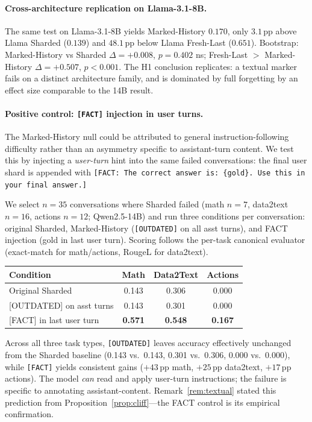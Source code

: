 \documentclass{article}
\begin{document}
\paragraph{Cross-architecture replication on Llama-3.1-8B.} The same test on Llama-3.1-8B yields Marked-History $0.170$, only $3.1$\,pp above Llama Sharded ($0.139$) and $48.1$\,pp below Llama Fresh-Last ($0.651$). Bootstrap: Marked-History vs Sharded $\Delta{=}{+}0.008$, $p{=}0.402$ ns; Fresh-Last $>$ Marked-History $\Delta{=}{+}0.507$, $p<0.001$. The H1 conclusion replicates: a textual marker fails on a distinct architecture family, and is dominated by full forgetting by an effect size comparable to the 14B result.

\paragraph{Positive control: \texttt{[FACT]} injection in user turns.}
The Marked-History null could be attributed to general instruction-following difficulty rather than an asymmetry specific to assistant-turn content.
We test this by injecting a \emph{user-turn} hint into the same failed conversations: the final user shard is appended with \texttt{[FACT: The correct answer is: \{gold\}. Use this in your final answer.]}

We select $n=35$ conversations where Sharded failed (math $n=7$, data2text $n=16$, actions $n=12$; Qwen2.5-14B) and run three conditions per conversation: original Sharded, Marked-History (\texttt{[OUTDATED]} on all asst turns), and FACT injection (gold in last user turn).
Scoring follows the per-task canonical evaluator (exact-match for math/actions, RougeL for data2text).

\begin{center}
\small
\begin{tabular}{lccc}
\toprule
Condition & Math & Data2Text & Actions \\
\midrule
Original Sharded & 0.143 & 0.306 & 0.000 \\
\textsc{[OUTDATED]} on asst turns & 0.143 & 0.301 & 0.000 \\
\textsc{[FACT]} in last user turn & \textbf{0.571} & \textbf{0.548} & \textbf{0.167} \\
\bottomrule
\end{tabular}
\end{center}

Across all three task types, \texttt{[OUTDATED]} leaves accuracy effectively unchanged from the Sharded baseline (0.143 vs.\ 0.143, 0.301 vs.\ 0.306, 0.000 vs.\ 0.000), while \texttt{[FACT]} yields consistent gains ($+43$\,pp math, $+25$\,pp data2text, $+17$\,pp actions).
The model \emph{can} read and apply user-turn instructions; the failure is specific to annotating assistant-content.
Remark~\ref{rem:textual} stated this prediction from Proposition~\ref{prop:cliff}---the FACT control is its empirical confirmation.
\end{document}
